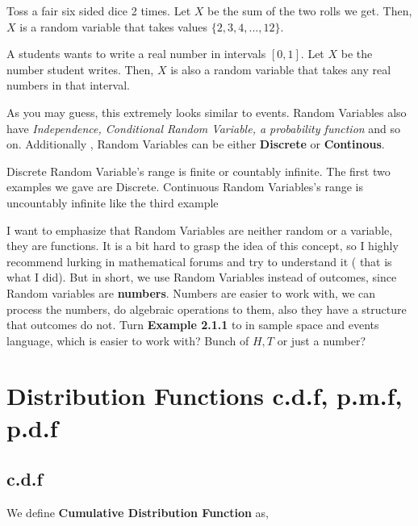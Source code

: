 \begin{example}
    Toss a fair six sided dice 2 times. Let $X$ be the sum of the two rolls we get. Then, $X$ is a random variable that takes values $\{2,3,4,...,12\}$.
\end{example}

\begin{example}
    A students wants to write a real number in intervals $[0,1]$. Let $X$ be the number student writes. Then, $X$ is also a random variable that takes any real numbers in that interval.
\end{example}

As you may guess, this extremely looks similar to events. Random Variables also have \textit{Independence, Conditional Random Variable, a probability function} and so on. Additionally , Random Variables can be either \textbf{Discrete} or \textbf{Continous}.
\par 
Discrete Random Variable's range is finite or countably infinite. The first two examples we gave are Discrete. Continuous Random Variables's range is uncountably infinite like the third example \newline

I want to emphasize  that Random Variables are neither random or a variable, they are functions. It is a bit hard to grasp the idea of this concept, so I highly recommend lurking in mathematical forums and try to understand it ( that is what I did). But in short, we use Random Variables instead of outcomes, since Random variables are \textbf{numbers}. Numbers are easier to work with, we can process the numbers, do algebraic operations to them, also they have a structure that outcomes do not.
Turn \textbf{ Example 2.1.1} to in sample space and events language, which is easier to work with? Bunch of $H,T$ or just a number?





\section{Distribution Functions c.d.f, p.m.f, p.d.f}
\subsection*{c.d.f}
We define  \textbf{Cumulative Distribution Function} as,

